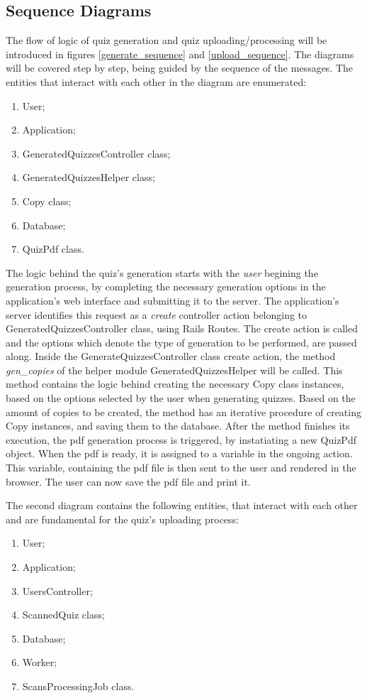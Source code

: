 \subsection{Sequence Diagrams}
The flow of logic of quiz generation and quiz uploading/processing will be introduced in figures \ref{generate_sequence} and \ref{upload_sequence}. The diagrams will be covered step by step, being guided by the sequence of the messages. The entities that interact with each other in the diagram are enumerated:
\vspace{-5pt}
\begin{enumerate}
  \item User;
  \item Application;
  \item GeneratedQuizzesController class;
  \item GeneratedQuizzesHelper class;
  \item Copy class;
  \item Database;
  \item QuizPdf class.
\end{enumerate}


The logic behind the quiz's generation starts with the \textit{user} begining the generation process, by completing the necessary generation options in the application's web interface and submitting it to the server. The application's server identifies this request as a \textit{create} controller action belonging to GeneratedQuizzesController class, using Rails Routes. The create action is called and the options which denote the type of generation to be performed, are passed along. Inside the GenerateQuizzesController class create action, the method \textit{gen\_copies} of the helper module GeneratedQuizzesHelper will be called. This method contains the logic behind creating the necessary Copy class instances, based on the options selected by the user when generating quizzes. Based on the amount of copies to be created, the method has an iterative procedure of creating Copy instances, and saving them to the database. After the method finishes its execution, the pdf generation process is triggered, by instatiating a new QuizPdf object. When the pdf is ready, it is assigned to a variable in the ongoing action. This variable, containing the pdf file is then sent to the user and rendered in the browser. The user can now save the pdf file and print it.

The second diagram contains the following entities, that interact with each other and are fundamental for the quiz's uploading process:
\begin{enumerate}
  \item User;
  \item Application;
  \item UsersController;
  \item ScannedQuiz class;
  \item Database;
  \item Worker;
  \item ScansProcessingJob class.
\end{enumerate}

